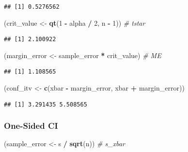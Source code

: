 \documentclass[
]{article}
\newenvironment{Shaded}{\begin{snugshade}}{\end{snugshade}}
\newcommand{\CommentTok}[1]{\textcolor[rgb]{0.56,0.35,0.01}{\textit{#1}}}
\newcommand{\DecValTok}[1]{\textcolor[rgb]{0.00,0.00,0.81}{#1}}
\newcommand{\FunctionTok}[1]{\textcolor[rgb]{0.13,0.29,0.53}{\textbf{#1}}}
\newcommand{\NormalTok}[1]{#1}
\newcommand{\OtherTok}[1]{\textcolor[rgb]{0.56,0.35,0.01}{#1}}
\newcommand{\SpecialCharTok}[1]{\textcolor[rgb]{0.81,0.36,0.00}{\textbf{#1}}}
\begin{document}
\begin{verbatim}
## [1] 0.5276562
\end{verbatim}

\begin{Shaded}
\begin{Highlighting}[]
\NormalTok{(crit\_value }\OtherTok{\textless{}{-}} \FunctionTok{qt}\NormalTok{(}\DecValTok{1} \SpecialCharTok{{-}}\NormalTok{ alpha }\SpecialCharTok{/} \DecValTok{2}\NormalTok{, n }\SpecialCharTok{{-}} \DecValTok{1}\NormalTok{)) }\CommentTok{\# tstar}
\end{Highlighting}
\end{Shaded}

\begin{verbatim}
## [1] 2.100922
\end{verbatim}

\begin{Shaded}
\begin{Highlighting}[]
\NormalTok{(margin\_error }\OtherTok{\textless{}{-}}\NormalTok{ sample\_error }\SpecialCharTok{*}\NormalTok{ crit\_value) }\CommentTok{\# ME}
\end{Highlighting}
\end{Shaded}

\begin{verbatim}
## [1] 1.108565
\end{verbatim}

\begin{Shaded}
\begin{Highlighting}[]
\NormalTok{(conf\_itv }\OtherTok{\textless{}{-}} \FunctionTok{c}\NormalTok{(xbar }\SpecialCharTok{{-}}\NormalTok{ margin\_error, xbar }\SpecialCharTok{+}\NormalTok{ margin\_error))}
\end{Highlighting}
\end{Shaded}

\begin{verbatim}
## [1] 3.291435 5.508565
\end{verbatim}

\subsubsection{One-Sided CI}\label{one-sided-ci}

\begin{Shaded}
\begin{Highlighting}[]
\NormalTok{(sample\_error }\OtherTok{\textless{}{-}}\NormalTok{ s }\SpecialCharTok{/} \FunctionTok{sqrt}\NormalTok{(n)) }\CommentTok{\# s\_xbar}
\end{Highlighting}
\end{Shaded}
\end{document}
